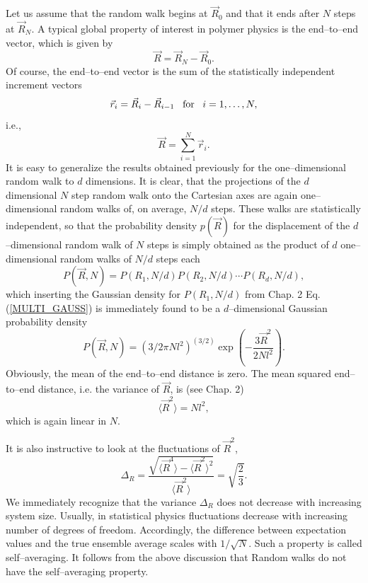 Let us assume that the random walk begins at $\vec{R}_0$ and that 
it ends after $N$ steps at $\vec{R}_N$. A typical global property
of interest in polymer physics is the end--to--end vector,
which is given by
\begin{equation*}
\vec{R} = \vec{R}_N -\vec{R}_0.
\end{equation*}
Of course, the end--to--end vector is the sum of the statistically 
independent increment vectors
\begin{equation*}
\vec{r}_i = \vec{R}_i - \vec{R}_{i-1} \;\;\; {\rm for} \;\;\; 
       i=1, \ldots, N,
\end{equation*}
i.e.,
\begin{equation*}
\vec{R} = \sum_{i=1}^N \vec{r}_i.
\end{equation*}
It is easy to generalize the results obtained previously for the 
one--dimensional random walk to $d$ dimensions. It is clear, that 
the projections of the $d$ dimensional $N$ step random walk onto 
the Cartesian axes are again one--dimensional random walks of, on 
average, $N/d$ steps. These walks are statistically independent, 
so that the probability density $p(\vec{R})$ for the displacement
of the $d$--dimensional random walk of $N$ steps is simply 
obtained as the product of $d$ one--dimensional random walks of $N/d$
steps each
\begin{equation*}
P(\vec{R},N) = P(R_1,N/d) P(R_2,N/d) \cdots P(R_d,N/d),
\end{equation*}
which inserting the Gaussian density for $P(R_1,N/d)$ from Chap. 2 Eq. 
(\ref{MULTI_GAUSS}) is immediately found to be a $d$--dimensional Gaussian 
probability density
\begin{equation*}
P(\vec{R},N) = \left(3/2 \pi Nl^2 \right)^{(3/2)} 
              \exp\left( - \frac{3\vec{R}^2}{2Nl^2}\right).
\end{equation*}
Obviously, the mean of the end--to--end distance is zero. The mean
squared end--to--end distance, i.e. the variance of $\vec{R}$, 
is (see Chap. 2) 
\begin{equation}
\label{RW_R2}
\langle \vec{R}^2 \rangle = N l^2,
\end{equation}
which is again linear in $N$.

It is also instructive to look at the fluctuations of $\vec{R}^2$,
\begin{equation*}
\Delta_R = \frac{\sqrt{\langle \vec{R}^4 \rangle - 
                   \langle \vec{R}^2\rangle^2}}
             {\langle \vec{R}^2\rangle}
             = \sqrt{\frac{2}{3}}.
\end{equation*}
We immediately recognize that the variance $\Delta_R$ does not 
decrease with increasing system size. Usually, in statistical physics
fluctuations decrease with increasing number of degrees of freedom.
Accordingly, the difference between expectation values and the 
true ensemble average
scales with $1/\sqrt{N}$. Such a property is called
self--averaging. It follows from the above discussion that  
Random walks do not have the self--averaging property.

